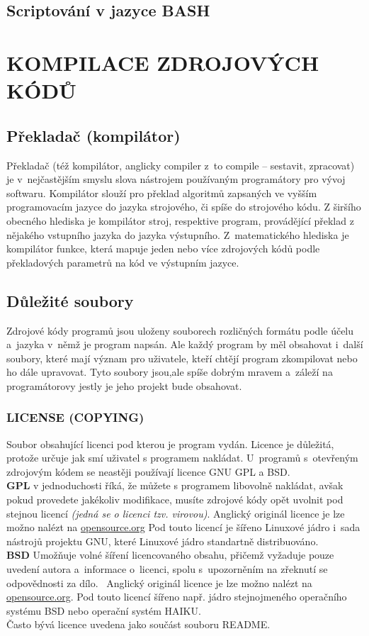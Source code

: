 \documentclass[a4paper,12pt]{article}
\newcommand{\sectionV}[1]{\section{\uppercase{#1}}}	%
\renewcommand{\b}[1]{\textbf{#1}} %
\renewcommand{\it}[1]{\textit{#1}}		%
\begin{document}
\subsection{Scriptování v jazyce BASH}


\sectionV{Kompilace zdrojových kódů}
\subsection{Překladač (kompilátor)}
Překladač (též kompilátor, anglicky compiler z~to compile – sestavit, zpracovat) je v~nejčastějším smyslu slova nástrojem používaným programátory pro vývoj softwaru. Kompilátor slouží pro překlad algoritmů zapsaných ve vyšším programovacím jazyce do jazyka strojového, či spíše do strojového kódu. Z širšího obecného hlediska je kompilátor stroj, respektive program, provádějící překlad z nějakého vstupního jazyka do jazyka výstupního. Z~matematického hlediska je kompilátor funkce, která mapuje jeden nebo více zdrojových kódů podle překladových parametrů na kód ve výstupním jazyce.~\cite{Wkom}
\subsection{Důležité soubory}
Zdrojové kódy programů jsou uloženy souborech rozličných formátu podle účelu a~jazyka v~němž je program napsán. Ale každý program by měl obsahovat i~další soubory, které mají význam pro uživatele, kteří chtějí program zkompilovat nebo ho dále upravovat. Tyto soubory jsou,ale spíše dobrým mravem a~záleží na programátorovy jestly je jeho projekt bude obsahovat.
\subsubsection{LICENSE (COPYING)}
Soubor obsahující licenci pod kterou je program vydán. Licence je důležitá, protože určuje jak smí uživatel s programem nakládat. U~programů s~otevřeným zdrojovým kódem se neastěji používají licence GNU GPL a BSD.\\ \b{GPL} v jednoduchosti říká, že můžete s programem libovolně nakládat, avšak pokud provedete jakékoliv modifikace, musíte zdrojové kódy opět uvolnit pod stejnou licencí \it{(jedná se o licenci tzv. virovou)}. Anglický originál licence je lze možno nalézt na \href{http://www.opensource.org/licenses/gpl-3.0}{opensource.org} Pod touto licencí je šířeno Linuxové jádro i~sada nástrojů projektu GNU, které Linuxové jádro standartně distribuováno.\\ \b{BSD} Umožňuje volné šíření licencovaného obsahu, přičemž vyžaduje pouze uvedení autora a~informace o~licenci, spolu s~upozorněním na zřeknutí se odpovědnosti za dílo.~\cite{BSDL} Anglický originál licence je lze možno nalézt na \href{http://www.opensource.org/licenses/bsd-license.php}{opensource.org}. Pod touto licencí šířeno např. jádro stejnojmeného operačního systému BSD nebo operační systém HAIKU.\\
Často bývá licence uvedena jako součást souboru README.
\end{document}
